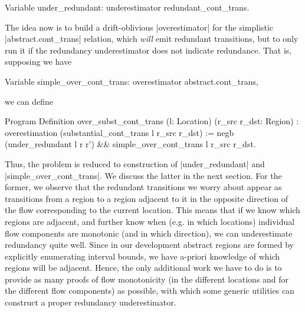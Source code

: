 \documentclass[runningheads]{llncs}
\begin{document}
{%
% 
% 

\begin{code}
Variable under_redundant: underestimator redundant_cont_trans.
\end{code}
The idea now is to build a drift-oblivious |overestimator| for the simplistic |abstract.cont_trans| relation, which \emph{will} emit redundant transitions, but to only run it if the redundancy underestimator does not indicate redundance. That is, supposing we have
\begin{code}
Variable simple_over_cont_trans: overestimator abstract.cont_trans,
\end{code}
we can define

\begin{code}
  Program Definition over_subst_cont_trans (l: Location) (r_src r_dst: Region)
    : overestimation (substantial_cont_trans l r_src r_dst)
    := negb (under_redundant l r r') && simple_over_cont_trans l r_src r_dst.
\end{code}

Thus, the problem is reduced to construction of |under_redundant| and |simple_over_cont_trans|. We discuss the latter in the next section. For the former, we observe that the redundant transitions we worry about appear as transitions from a region to a region adjacent to it in the opposite direction of the flow corresponding to the current location. This means that if we know which regions are adjacent, and further know when (e.g. in which locations) individual flow components are monotonic (and in which direction), we can underestimate redundancy quite well. Since in our development abstract regions are formed by explicitly enumerating interval bounds, we have a-priori knowledge of which regions will be adjacent. Hence, the only additional work we have to do is to provide as many proofs of flow monotonicity (in the different locations and for the different flow components) as possible, with which some generic utilities can construct a proper redundancy underestimator.

}
\end{document}
